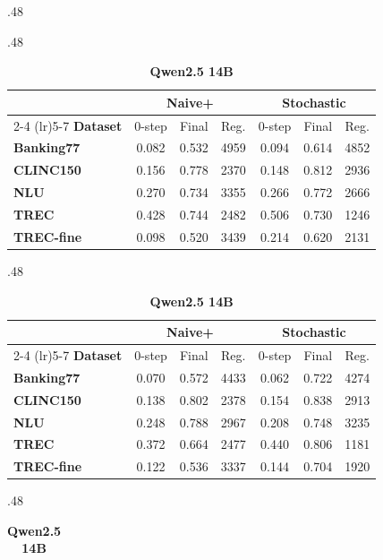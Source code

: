 \documentclass{article}
\theoremstyle{plain}
\theoremstyle{definition}
\theoremstyle{remark}
\newcommand{\banking}{Banking77\xspace}
\newcommand{\clinic}{CLINC150\xspace}
\newcommand{\trec}{TREC\xspace}
\newcommand{\trecfine}{TREC-fine\xspace}
\newcommand{\nlu}{NLU\xspace}
\newcommand{\naiveplusshort}{Naive+\xspace}
\newcommand{\expshort}{Stochastic\xspace}
\begin{document}
\begin{table}[t]
\begin{subtable}{.48\textwidth}
\end{subtable}
\vspace{1em}
\begin{subtable}{.48\textwidth}
\caption{\textbf{Qwen2.5 3B}}
\centering
\begin{tabular}{l ccc ccc}
\toprule
 & \multicolumn{3}{c}{\textbf{\naiveplusshort}}
 & \multicolumn{3}{c}{\textbf{\expshort}}\\
\cmidrule(lr){2-4}
\cmidrule(lr){5-7}
\textbf{Dataset}
& 0-step & Final & Reg.
& 0-step & Final & Reg.\\
\midrule
\textbf{\banking}   & 0.082 & 0.532 & 4959 & 0.094 & 0.614 & 4852 \\
\textbf{\clinic}    & 0.156 & 0.778 & 2370 & 0.148 & 0.812 & 2936 \\
\textbf{\nlu}       & 0.270 & 0.734 & 3355 & 0.266 & 0.772 & 2666 \\
\textbf{\trec}      & 0.428 & 0.744 & 2482 & 0.506 & 0.730 & 1246 \\
\textbf{\trecfine}  & 0.098 & 0.520 & 3439 & 0.214 & 0.620 & 2131 \\
\midrule[\heavyrulewidth]
\end{tabular}
\end{subtable}
\hfill
\begin{subtable}{.48\textwidth}
\caption{\textbf{Qwen2.5 7B}}
\centering
\begin{tabular}{l ccc ccc}
\toprule
 & \multicolumn{3}{c}{\textbf{\naiveplusshort}}
 & \multicolumn{3}{c}{\textbf{\expshort}}\\
\cmidrule(lr){2-4}
\cmidrule(lr){5-7}
\textbf{Dataset}
& 0-step & Final & Reg.
& 0-step & Final & Reg.\\
\midrule
\textbf{\banking}   & 0.070 & 0.572 & 4433 & 0.062 & 0.722 & 4274 \\
\textbf{\clinic}    & 0.138 & 0.802 & 2378 & 0.154 & 0.838 & 2913 \\
\textbf{\nlu}       & 0.248 & 0.788 & 2967 & 0.208 & 0.748 & 3235 \\
\textbf{\trec}      & 0.372 & 0.664 & 2477 & 0.440 & 0.806 & 1181 \\
\textbf{\trecfine}  & 0.122 & 0.536 & 3337 & 0.144 & 0.704 & 1920 \\
\midrule[\heavyrulewidth]
\end{tabular}
\end{subtable}
\vspace{1em}
\begin{subtable}{.48\textwidth}
\caption{\textbf{Qwen2.5 14B}}
\centering
\begin{tabular}{l ccc ccc}

\end{tabular}
\end{subtable}
\end{table}
\end{document}
